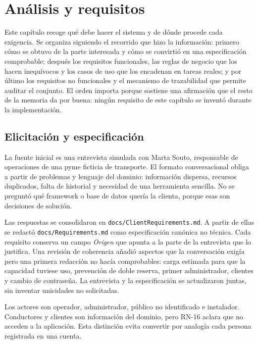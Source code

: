 \chapter{Análisis y requisitos}
\label{chap:requisitos}

Este capítulo recoge qué debe hacer el sistema y de dónde procede cada exigencia. Se organiza siguiendo el recorrido que hizo la información: primero cómo se obtuvo de la parte interesada y cómo se convirtió en una especificación comprobable; después los requisitos funcionales, las reglas de negocio que los hacen inequívocos y los casos de uso que los encadenan en tareas reales; y por último los requisitos no funcionales y el mecanismo de trazabilidad que permite auditar el conjunto. El orden importa porque sostiene una afirmación que el resto de la memoria da por buena: ningún requisito de este capítulo se inventó durante la implementación.

\section{Elicitación y especificación}

La fuente inicial es una entrevista simulada con Marta Souto, responsable de operaciones de una pyme ficticia de transporte. El formato conversacional obliga a partir de problemas y lenguaje del dominio: información dispersa, recursos duplicados, falta de historial y necesidad de una herramienta sencilla. No se preguntó qué framework o base de datos quería la clienta, porque esas son decisiones de solución.

Las respuestas se consolidaron en \texttt{docs/ClientRequirements.md}. A partir de ellas se redactó \texttt{docs/Requirements.md} como especificación canónica no técnica. Cada requisito conserva un campo \emph{Origen} que apunta a la parte de la entrevista que lo justifica. Una revisión de coherencia añadió aspectos que la conversación exigía pero una primera redacción no hacía comprobables: carga estimada para que la capacidad tuviese uso, prevención de doble reserva, primer administrador, clientes y cambio de contraseña. La entrevista y la especificación se actualizaron juntas, sin inventar unicidades no solicitadas.

Los actores son operador, administrador, público no identificado e instalador. Conductores y clientes son información del dominio, pero RN-16 aclara que no acceden a la aplicación. Esta distinción evita convertir por analogía cada persona registrada en una cuenta.

